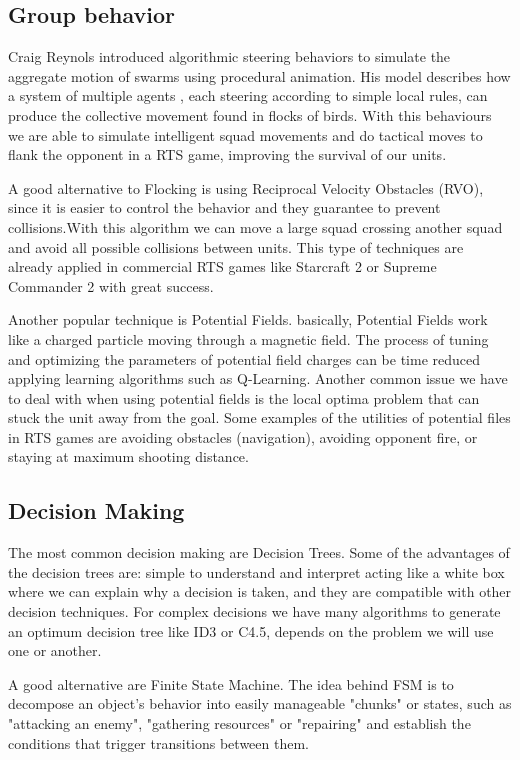 \documentclass[journal]{IEEEtran}
\begin{document}
\subsection{Group behavior}
{\color{ForestGreen}
Craig Reynols introduced algorithmic steering behaviors to simulate the aggregate motion of swarms using procedural animation\cite{Reynolds_1999}. His model describes how a system of multiple agents , each steering according to simple local rules, can produce the collective movement found in flocks of birds. With this behaviours we are able to simulate intelligent squad movements and do tactical moves to flank the opponent in a RTS game\cite{Danielsiek_2008}, improving the survival of our units.

A good alternative to Flocking is using Reciprocal Velocity Obstacles (RVO)\cite{Berg_2008}, since it is easier to control the behavior and they guarantee to prevent collisions.With this algorithm we can move a large squad crossing another squad and avoid all possible collisions between units. This type of techniques are already applied in commercial RTS games like Starcraft 2 or Supreme Commander 2 with great success.

Another popular technique is Potential Fields. basically, Potential Fields work like a charged particle moving through a magnetic field. The process of tuning and optimizing the parameters of potential field charges can be time reduced applying learning algorithms such as Q-Learning\cite{Liu_2008}. Another common issue we have to deal with when using potential fields is the local optima problem that can stuck the unit away from the goal.
Some examples of the utilities of potential files in RTS games are avoiding obstacles (navigation), avoiding opponent fire, or staying at maximum shooting distance\cite{Hagelback08}\cite{Hagelback09}.
}

\subsection{Decision Making}
{\color{ForestGreen}
The most common decision making are Decision Trees. Some of the advantages of the decision trees are: simple to understand and interpret acting like a white box where we can explain why a decision is taken, and they are compatible with other decision techniques. For complex decisions we have many algorithms to generate an optimum decision tree like ID3 or C4.5, depends on the problem we will use one or another.

A good alternative are Finite State Machine. The idea behind FSM is to decompose an object's behavior into easily manageable "chunks" or states, such as "attacking an enemy", "gathering resources" or "repairing" and establish the conditions that trigger transitions between them.
}
\end{document}
